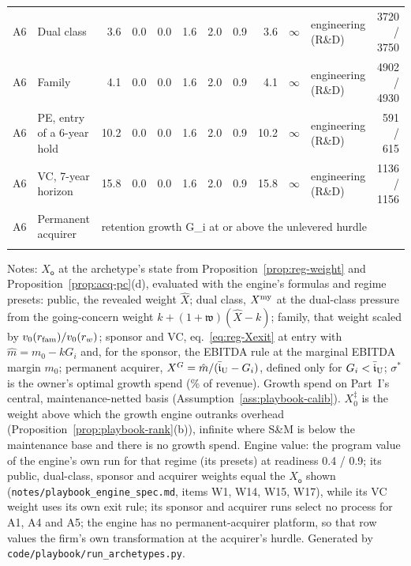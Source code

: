 \begin{table}[p]
\begin{tabular}{@{}llrrrrrrrrlr@{}}
A6 & Dual class & 3.6 & 0.0 & 0.0 & 1.6 & 2.0 & 0.9 & 3.6 & $\infty$ & engineering (R\&D) & 3720 / 3750 \\
A6 & Family & 4.1 & 0.0 & 0.0 & 1.6 & 2.0 & 0.9 & 4.1 & $\infty$ & engineering (R\&D) & 4902 / 4930 \\
A6 & PE, entry of a 6-year hold & 10.2 & 0.0 & 0.0 & 1.6 & 2.0 & 0.9 & 10.2 & $\infty$ & engineering (R\&D) & 591 / 615 \\
A6 & VC, 7-year horizon & 15.8 & 0.0 & 0.0 & 1.6 & 2.0 & 0.9 & 15.8 & $\infty$ & engineering (R\&D) & 1136 / 1156 \\
A6 & Permanent acquirer & \multicolumn{10}{l}{retention growth G\_i at or above the unlevered hurdle} \\
\addlinespace
\bottomrule
\end{tabular}

\smallskip
\begin{minipage}{0.98\linewidth}\scriptsize
Notes: $X_{\mathsf o}$ at the archetype's state from Proposition~\ref{prop:reg-weight} and Proposition~\ref{prop:acq-pc}(d), evaluated with the engine's formulas and regime presets: public, the revealed weight $\hat X$; dual class, $X^{\rm my}$ at the dual-class pressure from the going-concern weight $k+(1+\mathfrak w)(\hat X-k)$; family, that weight scaled by $v_0(r_{\rm fam})/v_0(r_w)$; sponsor and VC, eq.~\eqref{eq:reg-Xexit} at entry with $\hat m=m_0-kG_i$ and, for the sponsor, the EBITDA rule at the marginal EBITDA margin $m_0$; permanent acquirer, $X^G=\hat m/(\bar{\mathfrak i}_{\rm U}-G_i)$, defined only for $G_i<\bar{\mathfrak i}_{\rm U}$; $\sigma^*$ is the owner's optimal growth spend (\% of revenue). Growth spend on Part~I's central, maintenance-netted basis (Assumption~\ref{ass:playbook-calib}). $X^\ddagger_0$ is the weight above which the growth engine outranks overhead (Proposition~\ref{prop:playbook-rank}(b)), infinite where S\&M is below the maintenance base and there is no growth spend. Engine value: the program value of the engine's own run for that regime (its presets) at readiness 0.4 / 0.9; its public, dual-class, sponsor and acquirer weights equal the $X_{\mathsf o}$ shown (\texttt{notes/playbook\_engine\_spec.md}, items W1, W14, W15, W17), while its VC weight uses its own exit rule; its sponsor and acquirer runs select no process for A1, A4 and A5; the engine has no permanent-acquirer platform, so that row values the firm's own transformation at the acquirer's hurdle. Generated by \texttt{code/playbook/run\_archetypes.py}.
\end{minipage}
\end{table}

